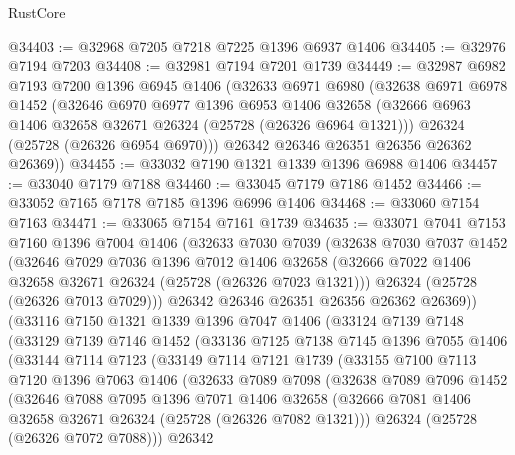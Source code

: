 \begin{lexlean}{RustCore}
\begin{coremodule}
@34403 := @32968 @7205 @7218 @7225 @1396 @6937 @1406
@34405 := @32976 @7194 @7203
@34408 := @32981 @7194 @7201 @1739
@34449 := @32987
    @6982
    @7193
    @7200
    @1396
    @6945
    @1406
    (@32633
      @6971
      @6980
      (@32638
        @6971
        @6978
        @1452
        (@32646
          @6970
          @6977
          @1396
          @6953
          @1406
          @32658
          (@32666 @6963 @1406 @32658 @32671 @26324 (@25728 (@26326 @6964 @1321)))
          @26324
          (@25728 (@26326 @6954 @6970)))
        @26342
        @26346
        @26351
        @26356
        @26362
        @26369))
@34455 := @33032 @7190 @1321 @1339 @1396 @6988 @1406
@34457 := @33040 @7179 @7188
@34460 := @33045 @7179 @7186 @1452
@34466 := @33052 @7165 @7178 @7185 @1396 @6996 @1406
@34468 := @33060 @7154 @7163
@34471 := @33065 @7154 @7161 @1739
@34635 := @33071
    @7041
    @7153
    @7160
    @1396
    @7004
    @1406
    (@32633
      @7030
      @7039
      (@32638
        @7030
        @7037
        @1452
        (@32646
          @7029
          @7036
          @1396
          @7012
          @1406
          @32658
          (@32666 @7022 @1406 @32658 @32671 @26324 (@25728 (@26326 @7023 @1321)))
          @26324
          (@25728 (@26326 @7013 @7029)))
        @26342
        @26346
        @26351
        @26356
        @26362
        @26369))
    (@33116
      @7150
      @1321
      @1339
      @1396
      @7047
      @1406
      (@33124
        @7139
        @7148
        (@33129
          @7139
          @7146
          @1452
          (@33136
            @7125
            @7138
            @7145
            @1396
            @7055
            @1406
            (@33144
              @7114
              @7123
              (@33149
                @7114
                @7121
                @1739
                (@33155
                  @7100
                  @7113
                  @7120
                  @1396
                  @7063
                  @1406
                  (@32633
                    @7089
                    @7098
                    (@32638
                      @7089
                      @7096
                      @1452
                      (@32646
                        @7088
                        @7095
                        @1396
                        @7071
                        @1406
                        @32658
                        (@32666 @7081 @1406 @32658 @32671 @26324 (@25728 (@26326 @7082 @1321)))
                        @26324
                        (@25728 (@26326 @7072 @7088)))
                      @26342

\end{coremodule}
\end{lexlean}
